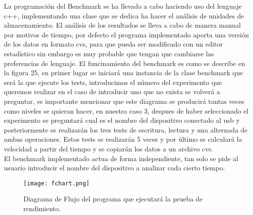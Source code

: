 \documentclass[a4paper, 10pt]{article} %
\begin{document}
La programación del Benchmark se ha llevado a cabo haciendo uso del lenguaje c++, implementando una clase que se dedica ha hacer el análisis de unidades de almacenamiento. El análisis de los resultados se lleva a cabo de manera manual por motivos de tiempo, por defecto el programa implementado aporta una versión de los datos en formato cvs, para que pueda ser modificado con un editor estadístico sin embargo es muy probable que tengan que cambiarse las preferencias de lenguaje. El funcinamiento del benchmark es como se describe en la figura 25, en primer lugar se iniciará una instancia de la clase benchmark que será la que ejecute los tests, introducimos el número del experimento que queremos realizar en el caso de introducir uno que no exista se volverá a preguntar, es importante mencionar que este diagrama se producirá tantas veces como niveles se quieran hacer, en nuestro caso 3, despues de haber seleccionado el experimento se preguntará cual es el nombre del dispositivo conectado al usb y posteriormente se realizarán los tres tests de escritura, lectura y una alternada de ambas operaciones. Estos tests se realizarán 5 veces y por último se calculará la velocidad a partir del tiempo y se copiarán los datos a un archivo cvs.\\
El benchmark implementado actua de forma independiente, tan solo se pide al usuario introducir el nombre del dispositivo a analizar cada cierto tiempo.
\begin{figure}[H]
\centering 
\texttt{[image: fchart.png]} 
\caption{Diagrama de Flujo del programa que ejecutará la prueba de rendimiento.} 
\label{contexto:figura} 
\end{figure}
\end{document}
